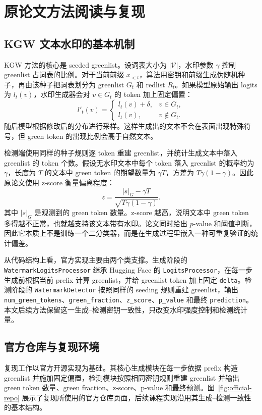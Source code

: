 \documentclass[a4paper,UTF8,zihao=5]{ctexart}
\begin{document}
\section{原论文方法阅读与复现}

\subsection{KGW 文本水印的基本机制}

KGW 方法的核心是 seeded greenlist。设词表大小为 $|\mathcal{V}|$，水印参数 $\gamma$ 控制 greenlist 占词表的比例。对于当前前缀 $x_{<t}$，算法用密钥和前缀生成伪随机种子，再由该种子把词表划分为 greenlist $G_t$ 和 redlist $R_t$。如果模型原始输出 logits 为 $l_t(v)$，水印生成器会对 $v\in G_t$ 的 token 加上固定偏置：
\[
    l'_t(v)=
    \begin{cases}
        l_t(v)+\delta, & v\in G_t,    \\
        l_t(v),        & v\notin G_t.
    \end{cases}
\]
随后模型根据修改后的分布进行采样。这样生成出的文本不会在表面出现特殊符号，但 green token 的出现比例会高于自然文本。

检测端使用同样的种子规则逐 token 重建 greenlist，并统计生成文本中落入 greenlist 的 token 个数。假设无水印文本中每个 token 落入 greenlist 的概率约为 $\gamma$，长度为 $T$ 的文本中 green token 的期望数量为 $\gamma T$，方差为 $T\gamma(1-\gamma)$。因此原论文使用 z-score 衡量偏离程度：
\[
    z=\frac{|s|_G-\gamma T}{\sqrt{T\gamma(1-\gamma)}}.
\]
其中 $|s|_G$ 是观测到的 green token 数量。z-score 越高，说明文本中 green token 多得越不正常，也就越支持该文本带有水印。论文同时给出 $p$-value 和阈值判断，因此它本质上不是训练一个二分类器，而是在生成过程里嵌入一种可重复验证的统计偏差。

从代码结构上看，官方实现主要由两个类支撑。生成阶段的 \texttt{WatermarkLogitsProcessor} 继承 Hugging Face 的 \texttt{LogitsProcessor}，在每一步生成前根据当前 prefix 计算 greenlist，并给 greenlist token 加上固定 \texttt{delta}。检测阶段的 \texttt{WatermarkDetector} 按照同样的 seeding 规则重建 greenlist，输出 \texttt{num\_green\_tokens}、\texttt{green\_fraction}、\texttt{z\_score}、\texttt{p\_value} 和最终 \texttt{prediction}。本文后续方法保留这一生成--检测密钥一致性，只改变水印强度控制和检测统计量。

\subsection{官方仓库与复现环境}

复现工作以官方开源实现为基础。其核心生成模块在每一步依据 prefix 构造 greenlist 并施加固定偏置，检测模块按照相同密钥规则重建 greenlist 并输出 green token 数量、green fraction、z-score、p-value 和最终预测。图~\ref{fig:official-repo} 展示了复现所使用的官方仓库页面，后续课程实现沿用其生成--检测一致性的基本结构。
\end{document}

